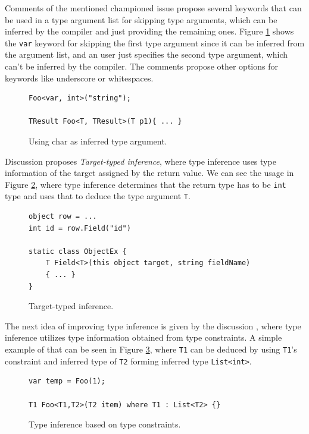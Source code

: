 \par
Comments of the mentioned championed issue \cite{online:champion} propose several keywords that can be used in a type argument list for skipping type arguments, which can be inferred by the compiler and just providing the remaining ones. 
Figure \ref{img22:CharITArg} shows the \texttt{var} keyword for skipping the first type argument since it can be inferred from the argument list, and an user just specifies the second type argument, which can’t be inferred by the compiler. 
The comments propose other options for keywords like underscore or whitespaces.
\begin{figure}[h]
\begin{lstlisting}[style=csharp]
Foo<var, int>("string");

TResult Foo<T, TResult>(T p1){ ... }
\end{lstlisting}
\caption{Using char as inferred type argument.}
\label{img22:CharITArg}
\end{figure}
\par
Discussion \cite{online:RetTInference} proposes \textit{Target-typed inference}, where type inference uses type information of the target assigned by the return value. 
We can see the usage in Figure \ref{img62:RetTInf}, where type inference determines that the return type has to be \texttt{int} type and uses that to deduce the type argument \texttt{T}.
\begin{figure}[h]
\begin{lstlisting}[style=csharp]
object row = ...
int id = row.Field("id")

static class ObjectEx {
	T Field<T>(this object target, string fieldName) 
	{ ... }
}
\end{lstlisting}
\caption{Target-typed inference.}
\label{img62:RetTInf}
\end{figure}
\par
The next idea of improving type inference is given by the discussion \cite{online:TInfConst}, where type inference utilizes type information obtained from type constraints.
A simple example of that can be seen in Figure \ref{img23:TInfConst}, where \texttt{T1} can be deduced by using \texttt{T1}'s constraint and inferred type of \texttt{T2} forming inferred type \texttt{List<int>}.
\begin{figure}[h!]
\begin{lstlisting}[style=csharp]
var temp = Foo(1);

T1 Foo<T1,T2>(T2 item) where T1 : List<T2> {}
\end{lstlisting}
\caption{Type inference based on type constraints.}
\label{img23:TInfConst}
\end{figure}

